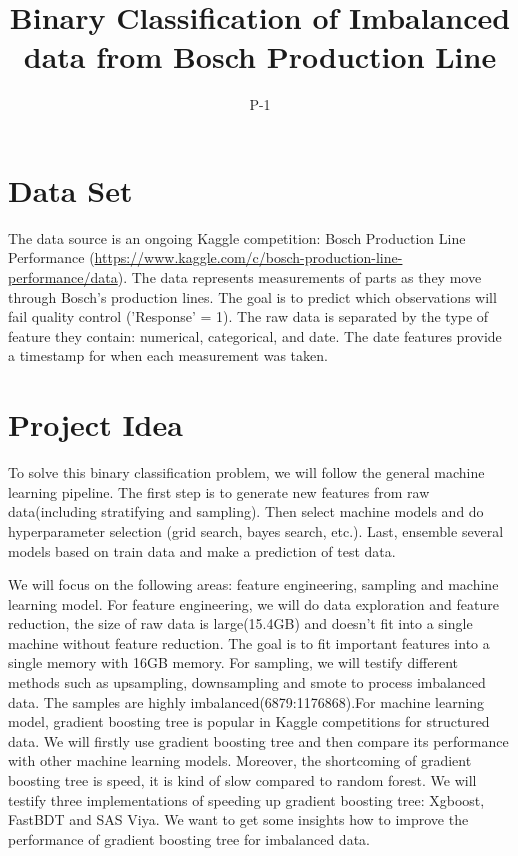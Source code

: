 \documentclass{article}
\title{Binary Classification of Imbalanced data from Bosch Production Line}
\author{
    P-1
}
\begin{document}

\maketitle

\section{Data Set}

The data source is an ongoing Kaggle competition: Bosch Production Line Performance (\url{https://www.kaggle.com/c/bosch-production-line-performance/data}). The data represents measurements of parts as they move through Bosch's production lines. The goal is to predict which observations will fail quality control ('Response' = 1). The raw data is separated by the type of feature they contain: numerical, categorical, and date. The date features provide a timestamp for when each measurement was taken.

\section{Project Idea}

To solve this binary classification problem, we will follow the general machine learning pipeline. The first step is to generate new features from raw data(including stratifying and sampling). Then select machine models and do hyperparameter selection (grid search, bayes search, etc.). Last, ensemble several models based on train data and make a prediction of test data.

We will focus on the following areas: feature engineering, sampling and machine learning model. For feature engineering, we will do data exploration and feature reduction, the size of raw data is large(15.4GB) and doesn't fit into a single machine without feature reduction. The goal is to fit important features into a single memory with 16GB memory. For sampling, we will testify different methods such as upsampling, downsampling and smote to process imbalanced data.  The samples are highly imbalanced(6879:1176868).For machine learning model, gradient boosting tree is popular in Kaggle competitions for structured data. We will firstly use gradient boosting tree and then compare its performance with other machine learning models. Moreover, the shortcoming of gradient boosting tree is speed, it is kind of slow compared to random forest. We will testify three implementations of speeding up gradient boosting tree: Xgboost, FastBDT and SAS Viya. We want to get some insights how to improve the performance of  gradient boosting tree for imbalanced data.
\end{document}
